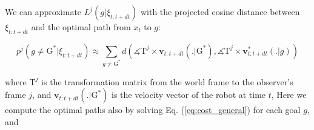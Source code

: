 We can approximate $L^j(g | \xi_{t:t+dt})$ with the projected cosine distance between $\xi_{t:t+dt}$ and the optimal path from $x_t$ to $g$:

\begin{equation}
    \label{eq:prob_leg_approx}
    p^j(g \neq \mathrm G^* | \xi_{t:t+dt}) \approx \sum_{g \neq \mathrm G^*}  d (\measuredangle \mathrm T^j \times \mathbf{v}_{t:t+dt}(.|\mathrm G^*),
                                                                 \measuredangle \mathrm T^j \times \mathbf{v}^*_{t:t+dt}(.|g))
\end{equation}

\noindent
where $\mathrm T^j$ is the transformation matrix from the world frame to the observer's frame $j$,
and $\mathbf{v}_{t:t+dt}(.|\mathrm G^*)$ is the velocity vector of the robot at time $t$,
Here we compute the optimal paths also by solving Eq. (\ref{eq:cost_general}) for each goal $g$, and


